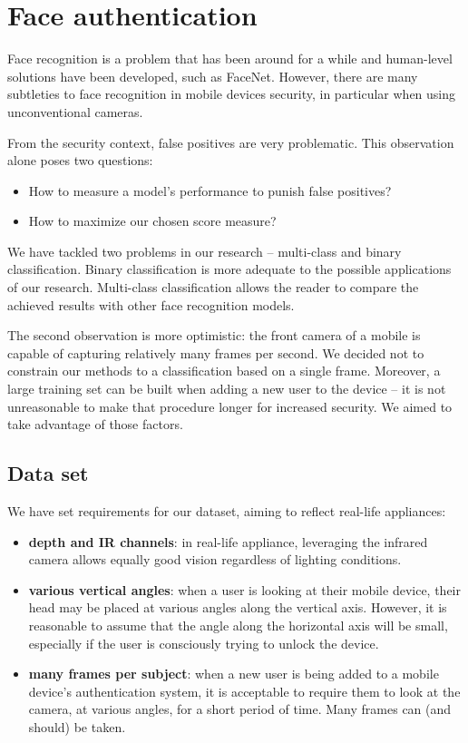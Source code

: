 \section{Face authentication}
    Face recognition is a problem that has been around for a while and
    human-level solutions have been developed, such as FaceNet\cite{arXiv:1503.03832}.
    However, there are many subtleties to face recognition in mobile devices
    security, in particular when using unconventional cameras.

    From the security context, false positives are very problematic. This observation alone
    poses two questions:
    \begin{itemize}
      \item How to measure a model's performance to punish false positives?
      \item How to maximize our chosen score measure?
    \end{itemize}
    We have tackled two problems in our research -- multi-class and binary classification.
    Binary classification is more adequate to the possible applications of our research.
    Multi-class classification allows the reader to compare the achieved results
    with other face recognition models.

    The second observation is more optimistic: the front camera of a mobile is capable of
    capturing relatively many frames per second. We decided not to constrain our
    methods to a classification based on a single frame.
    Moreover, a large training set can be built
    when adding a new user to the device -- it is not unreasonable to make that procedure
    longer for increased security. We aimed to take advantage of those factors.

    \subsection{Data set}
    We have set requirements for our dataset, aiming to reflect real-life
    appliances:
    \begin{itemize}
        \item \textbf{depth and IR channels}: in real-life appliance, leveraging
        the infrared camera allows equally good vision regardless of lighting
        conditions.
        \item \textbf{various vertical angles}: when a user is looking at their
        mobile device,
        their head may be placed at various angles along the vertical axis.
        However, it is reasonable to assume that the angle along the horizontal
        axis will be small, especially if the user is consciously trying to
        unlock the device.
        \item \textbf{many frames per subject}: when a new user is being added
        to a mobile device's authentication system, it is acceptable to require
        them to look at the camera, at various angles, for a short period of
        time. Many frames can (and should) be taken.
    \end{itemize}

